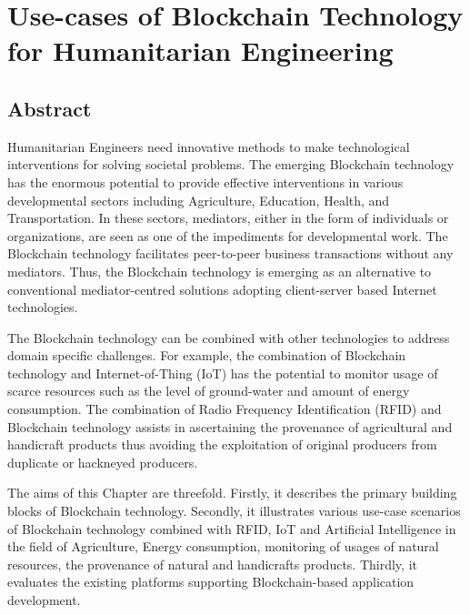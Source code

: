 \documentclass[10pt]{IETBook}
\begin{document}




\chapter{Use-cases of Blockchain Technology for Humanitarian Engineering}

\section*{Abstract} Humanitarian Engineers need innovative methods to make
technological interventions for solving  societal problems. 
The emerging Blockchain technology has the enormous potential to provide effective interventions in various developmental sectors including Agriculture, Education, Health, and Transportation. 
In these sectors, mediators, either in the form of individuals or organizations, are seen as one of the impediments for developmental work. 
The Blockchain technology facilitates peer-to-peer business transactions without any mediators.
Thus, the Blockchain technology is emerging as an alternative to conventional mediator-centred solutions adopting client-server based Internet technologies.

The Blockchain technology can be combined with other technologies to address domain specific challenges. 
For example, the combination of Blockchain technology and Internet-of-Thing (IoT) has the potential to monitor usage of scarce resources such as the level of ground-water and amount of energy consumption. 
The combination of Radio Frequency Identification (RFID) and Blockchain technology assists in ascertaining the provenance of agricultural and handicraft products thus avoiding the exploitation of original producers from  duplicate or hackneyed producers.

The aims of this Chapter are threefold. Firstly, it describes the primary building blocks of Blockchain technology. Secondly, it illustrates various use-case scenarios of Blockchain technology combined with RFID, IoT and Artificial Intelligence in the field of Agriculture, Energy consumption, monitoring of usages of natural resources, the provenance of natural and handicrafts products. 
Thirdly, it evaluates the existing platforms supporting Blockchain-based application development.
\end{document}
